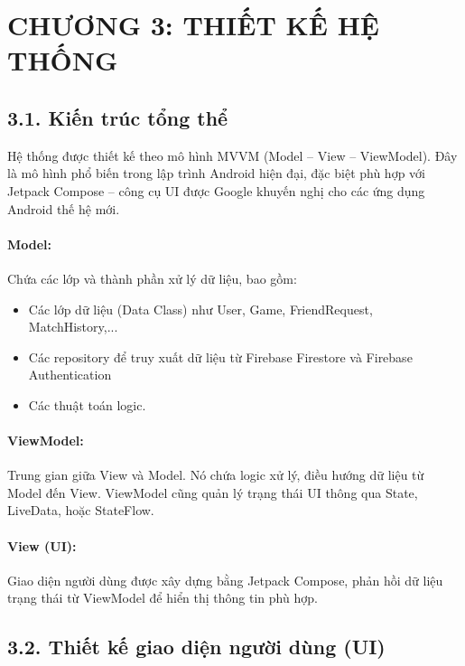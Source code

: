 \documentclass[a4paper,12pt]{article}
\begin{document}
\section*{\centering \textbf{CHƯƠNG 3: THIẾT KẾ HỆ THỐNG}} %

\subsection*{3.1. Kiến trúc tổng thể} %

\justify
\noindent Hệ thống được thiết kế theo mô hình MVVM (Model – View – ViewModel). Đây là mô hình phổ biến trong lập trình Android hiện đại, đặc biệt phù hợp với Jetpack Compose – công cụ UI được Google khuyến nghị cho các ứng dụng Android thế hệ mới.

\paragraph{Model:} %
\noindent Chứa các lớp và thành phần xử lý dữ liệu, bao gồm:
\begin{itemize}[label=·]
    \item Các lớp dữ liệu (Data Class) như User, Game, FriendRequest, MatchHistory,...
    \item Các repository để truy xuất dữ liệu từ Firebase Firestore và Firebase Authentication
    \item Các thuật toán logic.
\end{itemize}

\paragraph{ViewModel:} %
\noindent Trung gian giữa View và Model. Nó chứa logic xử lý, điều hướng dữ liệu từ Model đến View. ViewModel cũng quản lý trạng thái UI thông qua State, LiveData, hoặc StateFlow.

\paragraph{View (UI):} %
\noindent Giao diện người dùng được xây dựng bằng Jetpack Compose, phản hồi dữ liệu trạng thái từ ViewModel để hiển thị thông tin phù hợp.

\subsection*{3.2. Thiết kế giao diện người dùng (UI)} %
\end{document}
